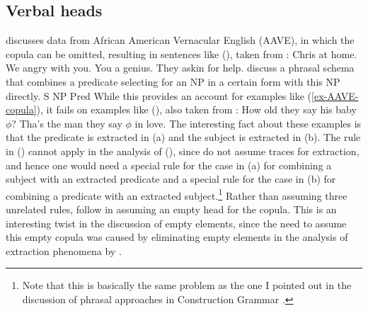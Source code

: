 \documentclass[output=paper
  ,nobabel
  ,draftmode
  ,uniformtopskip %
  ,colorlinks, citecolor=brown
]{langscibook}
\begin{document}



\subsection{Verbal heads}
\label{sec-empty-copula}

\citet{Bender2001a} discusses data from African American Vernacular English (AAVE), in which the
copula can be omitted, resulting in sentences like (), taken from :
\eal
\label{ex-AAVE-copula}
\ex Chris at home.
\ex We angry with you.
\ex You a genius.
\ex They askin for help.
\zl
\citet*[Section~15.3.4]{SWB2003a} discuss a phrasal schema that combines a predicate selecting for an NP
in a certain form with this NP directly. 
\ea
S \to{} NP Pred
\z
While this provides an account for examples like (\ref{ex-AAVE-copula}), it fails on examples like (), also
taken from :
\eal
\ex How old they say his baby $\phi$?
\ex Tha's the man they say $\phi$ in love.
\zl
The interesting fact about these examples is that the predicate is extracted in (a) and the
subject is extracted in (b). The rule in () cannot apply in the analysis of (),
since \citeauthor{SWB2003a} do not assume traces for extraction, and hence one would need a special
rule for the case in (a) for combining a subject with an extracted predicate and a special
rule for the case in (b) for combining a predicate with an extracted subject.\footnote{
  Note that this is basically the same problem as the one I pointed out in the discussion of phrasal
  approaches in Construction Grammar \citep[]{Mueller2006d}.
}
Rather than assuming three unrelated rules, \citeauthor{SWB2003a} follow \citet{Bender2001a} in
assuming an empty head for the copula. This is an interesting twist in the discussion of empty
elements, since the need to assume this empty copula was caused by eliminating empty elements in the
analysis of extraction phenomena by \citet*{BMS2001a}. 
\end{document}
